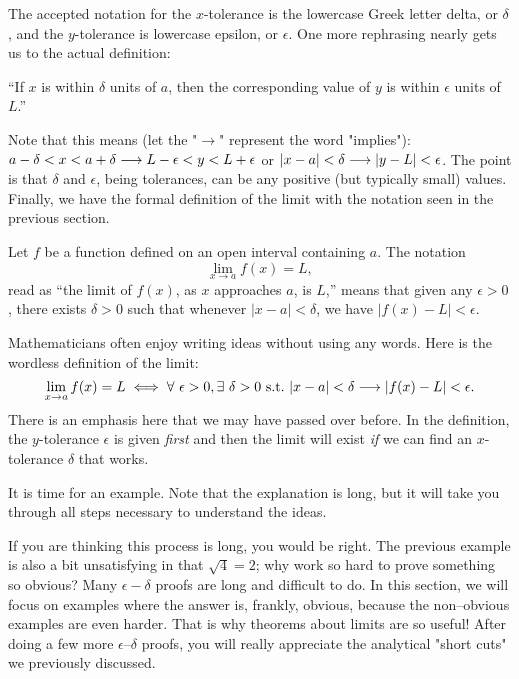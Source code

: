 The accepted notation for the $x$-tolerance is the lowercase Greek letter delta, or $\delta$, and the $y$-tolerance is lowercase epsilon, or $\epsilon$. One more rephrasing nearly gets us to the actual definition:

\begin{description}
\item ``If $x$ is within $\delta$ units of $a$, then the corresponding value of $y$ is within $\epsilon$ units of $L$.''
\end{description}

Note that this means (let the "$\longrightarrow$" represent the word "implies"):
$\displaystyle a - \delta < x < a + \delta \longrightarrow L - \epsilon < y < L + \epsilon$ or  $\displaystyle |x - a| < \delta \longrightarrow  |y - L| < \epsilon$. The point is that $\delta$ and $\epsilon$, being tolerances, can be any positive (but typically small) values.  Finally, we have the formal definition of the limit with the notation  seen in the previous section.

{Let $f$ be a function defined on an open interval containing $a$. The notation $$\displaystyle \lim_{x\rightarrow a} f(x) = L,$$ read as ``the limit of $f(x)$, as $x$ approaches $a$, is $L$,'' 
means that given any $\epsilon > 0$, there exists $\delta > 0$ such that 
whenever $|x - a| < \delta$, we have $|f(x) - L| < \epsilon$.
}%

Mathematicians often enjoy writing ideas without using any words. Here is the wordless definition of the limit:
{\small \[ \ds \lim_{x \to a} f(x) = L \iff \forall \ \epsilon > 0, \exists \ \delta > 0 \ \mbox{s.t.} \ |x - a| < \delta \longrightarrow |f(x) - L| < \epsilon. \]}
There is an emphasis here that we may have passed over before.  In the definition, the $y$-tolerance $\epsilon$ is given \textit{first} and then the limit will exist {\em if} we can find an $x$-tolerance $\delta$ that works.  

It is time for an example.  Note that the explanation is long, but it will take you through all steps necessary to understand the ideas.

 
If you are thinking this process is long, you would be right.  The previous example is also a bit unsatisfying in that $\sqrt{4}=2$; why work so hard to prove something so obvious? Many $\epsilon-\delta$ proofs are long and difficult to do. In this section, we will focus on examples where the answer is, frankly, obvious, because the non--obvious examples are even harder.  That is why theorems about limits are so useful! After doing a few more $\epsilon$--$\delta$ proofs, you will really appreciate the analytical "short cuts" we previously discussed. 

